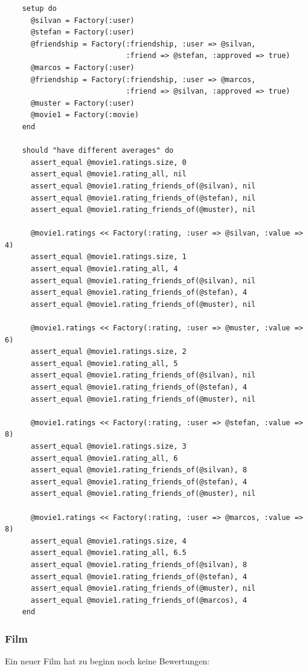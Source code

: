 \begin{verbatim}
    setup do 
      @silvan = Factory(:user)
      @stefan = Factory(:user)
      @friendship = Factory(:friendship, :user => @silvan, 
                            :friend => @stefan, :approved => true)
      @marcos = Factory(:user)
      @friendship = Factory(:friendship, :user => @marcos, 
                            :friend => @silvan, :approved => true)
      @muster = Factory(:user)
      @movie1 = Factory(:movie)
    end
    
    should "have different averages" do
      assert_equal @movie1.ratings.size, 0
      assert_equal @movie1.rating_all, nil
      assert_equal @movie1.rating_friends_of(@silvan), nil 
      assert_equal @movie1.rating_friends_of(@stefan), nil 
      assert_equal @movie1.rating_friends_of(@muster), nil 
      
      @movie1.ratings << Factory(:rating, :user => @silvan, :value => 4)
      assert_equal @movie1.ratings.size, 1
      assert_equal @movie1.rating_all, 4
      assert_equal @movie1.rating_friends_of(@silvan), nil 
      assert_equal @movie1.rating_friends_of(@stefan), 4 
      assert_equal @movie1.rating_friends_of(@muster), nil
      
      @movie1.ratings << Factory(:rating, :user => @muster, :value => 6)
      assert_equal @movie1.ratings.size, 2
      assert_equal @movie1.rating_all, 5
      assert_equal @movie1.rating_friends_of(@silvan), nil 
      assert_equal @movie1.rating_friends_of(@stefan), 4 
      assert_equal @movie1.rating_friends_of(@muster), nil
      
      @movie1.ratings << Factory(:rating, :user => @stefan, :value => 8)
      assert_equal @movie1.ratings.size, 3
      assert_equal @movie1.rating_all, 6
      assert_equal @movie1.rating_friends_of(@silvan), 8 
      assert_equal @movie1.rating_friends_of(@stefan), 4 
      assert_equal @movie1.rating_friends_of(@muster), nil
      
      @movie1.ratings << Factory(:rating, :user => @marcos, :value => 8)
      assert_equal @movie1.ratings.size, 4
      assert_equal @movie1.rating_all, 6.5
      assert_equal @movie1.rating_friends_of(@silvan), 8
      assert_equal @movie1.rating_friends_of(@stefan), 4 
      assert_equal @movie1.rating_friends_of(@muster), nil
      assert_equal @movie1.rating_friends_of(@marcos), 4
    end
\end{verbatim}

\subsubsection{Film}
Ein neuer Film hat zu beginn noch keine Bewertungen:

